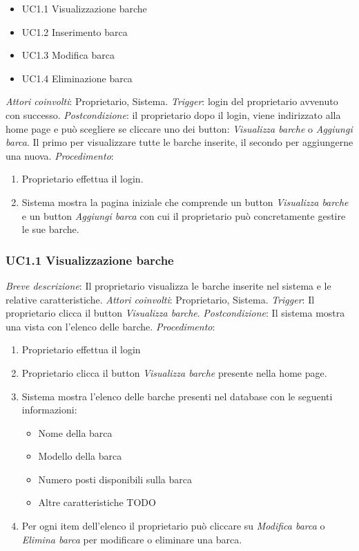 \begin{itemize}
    \item UC1.1 Visualizzazione barche
    \item UC1.2 Inserimento barca
    \item UC1.3 Modifica barca
    \item UC1.4 Eliminazione barca
\end{itemize}

\noindent \emph{Attori coinvolti}: Proprietario, Sistema.\medbreak
\noindent \emph{Trigger}: login del proprietario avvenuto con successo.\medbreak
\noindent \emph{Postcondizione}: il proprietario dopo il login, viene indirizzato alla home page e può scegliere se cliccare uno dei button: \textit{Visualizza barche} o \textit{Aggiungi barca}. Il primo per visualizzare
tutte le barche inserite, il secondo per aggiungerne una nuova.\medbreak
\noindent \emph{Procedimento}:

\begin{enumerate}
    \item Proprietario effettua il login.
    \item Sistema mostra la pagina iniziale che comprende un button \textit{Visualizza barche} e un button \textit{Aggiungi barca} con cui il proprietario può concretamente gestire le sue barche.
\end{enumerate}

\subsubsection{UC1.1 Visualizzazione barche}

\noindent \emph{Breve descrizione}: Il proprietario visualizza le barche inserite nel sistema e le relative caratteristiche.\medbreak
\noindent \emph{Attori coinvolti}: Proprietario, Sistema.\medbreak
\noindent \emph{Trigger}: Il proprietario clicca il button \textit{Visualizza barche}.\medbreak
\noindent \emph{Postcondizione}: Il sistema mostra una vista con l'elenco delle barche.\medbreak
\noindent \emph{Procedimento}:

\begin{enumerate}
    \item Proprietario effettua il login
    \item Proprietario clicca il button \textit{Visualizza barche} presente nella home page.
    \item Sistema mostra l'elenco delle barche presenti nel database con le seguenti informazioni:
          \begin{itemize}
              \item Nome della barca
              \item Modello della barca
              \item Numero posti disponibili sulla barca
              \item Altre caratteristiche TODO
          \end{itemize}
    \item Per ogni item dell'elenco il proprietario può cliccare su \textit{Modifica barca} o \textit{Elimina barca} per modificare o eliminare una barca.
\end{enumerate}

